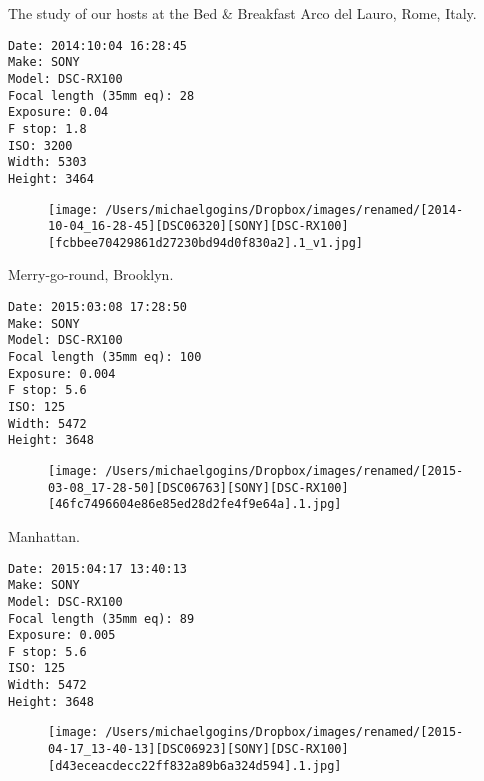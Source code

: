 \documentclass[11pt,letter,DIV=14,paper=landscape]{scrbook}
\begin{document}
\clearpage
\noindent The study of our hosts at the Bed & Breakfast Arco del Lauro, Rome, Italy.
\noindent
\begin{lstlisting}
Date: 2014:10:04 16:28:45
Make: SONY
Model: DSC-RX100
Focal length (35mm eq): 28
Exposure: 0.04
F stop: 1.8
ISO: 3200
Width: 5303
Height: 3464
\end{lstlisting}
\clearpage

\begin{figure}
\texttt{[image: /Users/michaelgogins/Dropbox/images/renamed/[2014-10-04\_16-28-45][DSC06320][SONY][DSC-RX100][fcbbee70429861d27230bd94d0f830a2].1\_v1.jpg]}
\end{figure}
    
\clearpage
\noindent Merry-go-round, Brooklyn.
\noindent
\begin{lstlisting}
Date: 2015:03:08 17:28:50
Make: SONY
Model: DSC-RX100
Focal length (35mm eq): 100
Exposure: 0.004
F stop: 5.6
ISO: 125
Width: 5472
Height: 3648
\end{lstlisting}
\clearpage

\begin{figure}
\texttt{[image: /Users/michaelgogins/Dropbox/images/renamed/[2015-03-08\_17-28-50][DSC06763][SONY][DSC-RX100][46fc7496604e86e85ed28d2fe4f9e64a].1.jpg]}
\end{figure}
    
\clearpage
\noindent Manhattan.
\noindent
\begin{lstlisting}
Date: 2015:04:17 13:40:13
Make: SONY
Model: DSC-RX100
Focal length (35mm eq): 89
Exposure: 0.005
F stop: 5.6
ISO: 125
Width: 5472
Height: 3648
\end{lstlisting}
\clearpage

\begin{figure}
\texttt{[image: /Users/michaelgogins/Dropbox/images/renamed/[2015-04-17\_13-40-13][DSC06923][SONY][DSC-RX100][d43eceacdecc22ff832a89b6a324d594].1.jpg]}
\end{figure}
    
\end{document}
